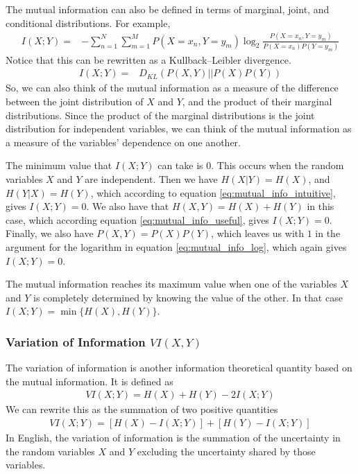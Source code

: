 \documentclass[a4paper,12pt]{article}
\theoremstyle{definition}
\begin{document}
        The mutual information can also be defined in terms of marginal, joint, and conditional distributions. For example,
        \begin{align}\label{eq:mutual_info_log}
        I(X;Y)  =& -\sum_{n=1}^N \sum_{m=1}^M P(X=x_n, Y=y_m) \log _2 \frac{P(X=x_n, Y=y_m)}{P(X=x_n) P(Y=y_m)}
        \end{align}
        Notice that this can be rewritten as a Kullback–Leibler divergence.
        \begin{align}
        I(X;Y)  =& D_{KL}(P(X,Y)|| P(X)P(Y))
        \end{align}
        So, we can also think of the mutual information as a measure of the difference between the joint distribution of $X$ and $Y$, and the product of their marginal distributions. Since the product of the marginal distributions is the joint distribution for independent variables, we can think of the mutual information as a measure of the variables' dependence on one another.

        The minimum value that $I(X;Y)$ can take is $0$. This occurs when the random variables $X$ and $Y$ are independent. Then we have $H(X|Y) = H(X)$, and $H(Y|X) = H(Y)$, which according to equation \ref{eq:mutual_info_intuitive}, gives $I(X;Y) = 0$. We also have that $H(X,Y) = H(X) + H(Y)$ in this case, which according equation \ref{eq:mutual_info_useful}, gives $I(X;Y) = 0$. Finally, we also have $P(X,Y) = P(X)P(Y)$, which leaves us with $1$ in the argument for the logarithm in equation \ref{eq:mutual_info_log}, which again gives $I(X;Y) = 0$.

        The mutual information reaches its maximum value when one of the variables $X$ and $Y$ is completely determined by knowing the value of the other. In that case $I(X;Y) = \min \lbrace H(X), H(Y) \rbrace$.

        \subsubsection{Variation of Information $VI(X,Y)$}\label{sec:variation_of_information}
        The variation of information is another information theoretical quantity based on the mutual information. It is defined as
        \begin{align}\label{eq:variation_of_information}
            VI(X;Y) = H(X) + H(Y) - 2 I(X;Y)
        \end{align}
        We can rewrite this as the summation of two positive quantities
        \begin{align}
            VI(X;Y) = \left[ H(X) - I(X;Y) \right] + \left[ H(Y) - I(X;Y) \right]
        \end{align}
        In English, the variation of information is the summation of the uncertainty in the random variables $X$ and $Y$ excluding the uncertainty shared by those variables.
\end{document}
